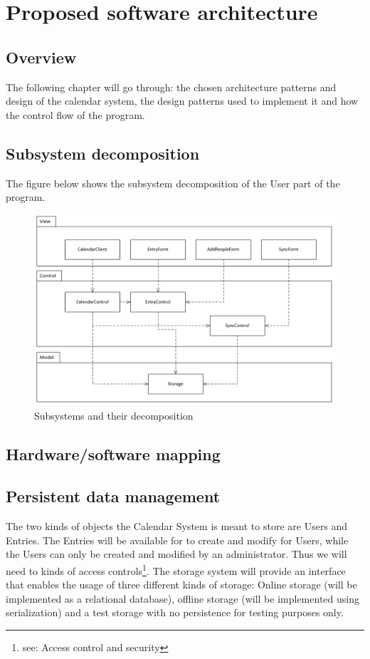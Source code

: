 \section{Proposed software architecture}
\subsection{Overview}
The following chapter will go through: the chosen architecture patterns and design of the calendar system, the design patterns used to implement it and how the control flow of the program.
\subsection{Subsystem decomposition}
The figure below shows the subsystem decomposition of the User part of the program.
\begin{figure}[h]
\centering
\includegraphics[scale = 0.6]{systemModel}
\caption{Subsystems and their decomposition}
\end{figure}
\subsection{Hardware/software mapping}
\subsection{Persistent data management}
The two kinds of objects the Calendar System is meant to store are Users and Entries. The Entries will be available for to create and modify for Users, while the Users can only be created and modified by an administrator. Thus we will need to kinds of access controls\footnote{see: Access control and security}. The storage system will provide an interface that enables the usage of three different kinds of storage: Online storage (will be implemented as a relational database), offline storage (will be implemented using serialization) and a test storage with no persistence for testing purposes only.

